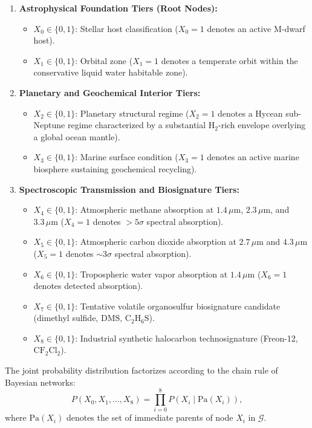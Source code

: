 \begin{enumerate}[leftmargin=*]
    \item \textbf{Astrophysical Foundation Tiers (Root Nodes):}
    \begin{itemize}
        \item $X_0 \in \{0, 1\}$: Stellar host classification ($X_0 = 1$ denotes an active M-dwarf host).
        \item $X_1 \in \{0, 1\}$: Orbital zone ($X_1 = 1$ denotes a temperate orbit within the conservative liquid water habitable zone).
    \end{itemize}
    \item \textbf{Planetary and Geochemical Interior Tiers:}
    \begin{itemize}
        \item $X_2 \in \{0, 1\}$: Planetary structural regime ($X_2 = 1$ denotes a Hycean sub-Neptune regime characterized by a substantial $\mathrm{H}_2$-rich envelope overlying a global ocean mantle).
        \item $X_3 \in \{0, 1\}$: Marine surface condition ($X_3 = 1$ denotes an active marine biosphere sustaining geochemical recycling).
    \end{itemize}
    \item \textbf{Spectroscopic Transmission and Biosignature Tiers:}
    \begin{itemize}
        \item $X_4 \in \{0, 1\}$: Atmospheric methane absorption at $1.4\,\mu\mathrm{m}$, $2.3\,\mu\mathrm{m}$, and $3.3\,\mu\mathrm{m}$ ($X_4 = 1$ denotes $>5\sigma$ spectral absorption).
        \item $X_5 \in \{0, 1\}$: Atmospheric carbon dioxide absorption at $2.7\,\mu\mathrm{m}$ and $4.3\,\mu\mathrm{m}$ ($X_5 = 1$ denotes $\sim 3\sigma$ spectral absorption).
        \item $X_6 \in \{0, 1\}$: Tropospheric water vapor absorption at $1.4\,\mu\mathrm{m}$ ($X_6 = 1$ denotes detected absorption).
        \item $X_7 \in \{0, 1\}$: Tentative volatile organosulfur biosignature candidate (dimethyl sulfide, $\mathrm{DMS}$, $\mathrm{C}_2\mathrm{H}_6\mathrm{S}$).
        \item $X_8 \in \{0, 1\}$: Industrial synthetic halocarbon technosignature (Freon-12, $\mathrm{CF}_2\mathrm{Cl}_2$).
    \end{itemize}
\end{enumerate}

The joint probability distribution factorizes according to the chain rule of Bayesian networks:
\begin{equation}
P(X_0, X_1, \dots, X_8) = \prod_{i=0}^8 P(X_i \mid \mathrm{Pa}(X_i)),
\label{eq:app_joint_factorization}
\end{equation}
where $\mathrm{Pa}(X_i)$ denotes the set of immediate parents of node $X_i$ in $\mathcal{G}$.

